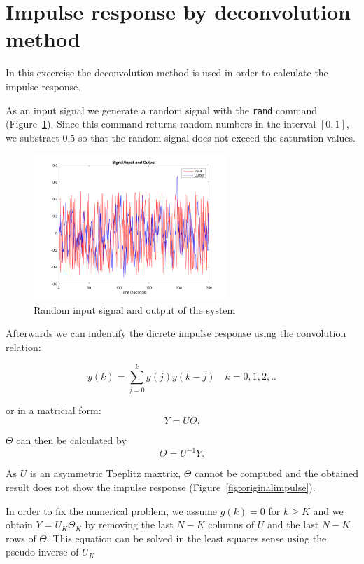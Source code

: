 \documentclass{scrartcl}
\begin{document}
\newpage

\section{Impulse response by deconvolution method}

In this excercise the deconvolution method is used in order to calculate the impulse response. 


As an input signal we generate a random signal with the \verb|rand| command (Figure~\ref{fig:inout}).
Since this command returns random numbers in the interval $[0,1]$, we substract $0.5$ so that the random signal does not exceed the saturation values. 

\begin{figure}[h]
	\centering
	\includegraphics[height=5.5cm]{figures/input_output.png}
	\caption{Random input signal and output of the system }
	\label{fig:inout}
\end{figure}


Afterwards we can indentify the dicrete impulse response using the convolution relation:

\begin{equation}
	y(k) = \sum\limits_{j=0}^{k} g(j)y(k-j) \quad k=0,1,2,.. 
\end{equation}

or in a matricial form:
\begin{equation}
	Y = U \Theta.
\end{equation} 


$\Theta$ can then be calculated by 
\begin{equation}
	\Theta = U^{-1} Y.
\end{equation}

As $U$ is an asymmetric Toeplitz maxtrix, $\Theta$ cannot be computed and the obtained result does not show the impulse response (Figure~\ref{fig:originalimpulse}).


In order to fix the numerical problem, we assume $ g(k) = 0 $ for $ k \geq K $ and we obtain $ Y = U_{K} \Theta_{K}$ by removing the last $N-K$ columns of $U$ and the last $N-K$ rows of $\Theta$. 
This equation can be solved in the least squares sense using the pseudo inverse of $U_{K}$
\end{document}
